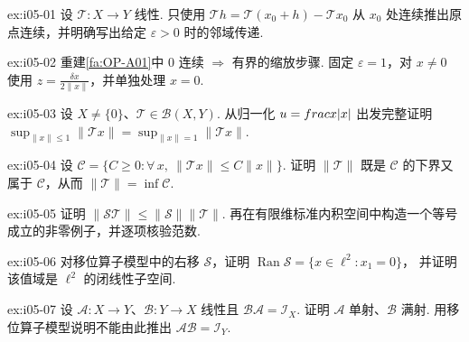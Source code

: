 \begin{FAExercise}[连续性在一点与原点]{ex:i05-01}
设 \(\displaystyle \mathcal T:X\to Y\) 线性. 只使用 \(\displaystyle \mathcal T h=\mathcal T(x_0+h)-\mathcal T x_0\) 从 \(\displaystyle x_0\) 处连续推出原点连续，并明确写出给定 \(\displaystyle \varepsilon>0\) 时的邻域传递.
\end{FAExercise}

\begin{FAExercise}[原点连续推出统一有界]{ex:i05-02}
重建\autoref{fa:OP-A01}中 \(\displaystyle0\) 连续 \(\displaystyle\Rightarrow\) 有界的缩放步骤. 固定 \(\displaystyle \varepsilon=1\)，对 \(\displaystyle x\neq0\) 使用 \(\displaystyle z=\frac{\delta x}{2\|x\|}\)，并单独处理 \(\displaystyle x=0\).
\end{FAExercise}

\begin{FAExercise}[单位球与单位球面上确界]{ex:i05-03}
设 \(\displaystyle X\neq\{0\}\)、\(\displaystyle \mathcal T\in\mathcal B(X,Y)\). 从归一化 \(\displaystyle u=\\frac{x}{\\|x\\|}\) 出发完整证明 \(\displaystyle \sup_{\|x\|\leqslant1}\|\mathcal T x\| =\sup_{\|x\|=1}\|\mathcal T x\|\).
\end{FAExercise}

\begin{FAExercise}[算子范数的最小常数刻画]{ex:i05-04}
设 \(\displaystyle \mathcal C=\{C\geqslant0:\forall\,x,\ \|\mathcal T x\|\leqslant C\|x\|\}\). 证明 \(\displaystyle \|\mathcal T\|\) 既是 \(\displaystyle \mathcal C\) 的下界又属于 \(\displaystyle \mathcal C\)，从而 \(\displaystyle \|\mathcal T\|=\inf\mathcal C\).
\end{FAExercise}

\begin{FAExercise}[复合估计与等号]{ex:i05-05}
证明 \(\displaystyle \|\mathcal S\mathcal T\|\leqslant\|\mathcal S\|\|\mathcal T\|\). 再在有限维标准内积空间中构造一个等号成立的非零例子，并逐项核验范数.
\end{FAExercise}

\begin{FAExercise}[右移的值域]{ex:i05-06}
对移位算子模型中的右移 \(\displaystyle \mathcal S\)，证明 \(\displaystyle \operatorname{Ran}\mathcal S =\{x\in\ell^2:x_1=0\}\)，
并证明该值域是 \(\displaystyle \ell^2\) 的闭线性子空间.
\end{FAExercise}

\begin{FAExercise}[左逆与右逆不能交换]{ex:i05-07}
设 \(\displaystyle \mathcal A:X\to Y\)、\(\displaystyle \mathcal B:Y\to X\) 线性且 \(\displaystyle \mathcal B\mathcal A=\mathcal I_X\). 证明 \(\displaystyle \mathcal A\) 单射、\(\displaystyle \mathcal B\) 满射. 用移位算子模型说明不能由此推出 \(\displaystyle \mathcal A\mathcal B=\mathcal I_Y\).
\end{FAExercise}

